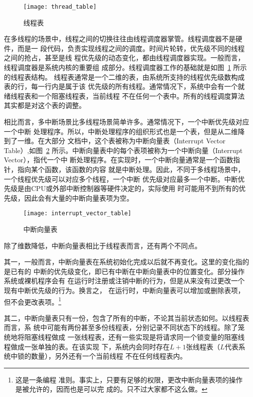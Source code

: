 \begin{figure}[H]
	\centering
	\texttt{[image: thread\_table]}
	\caption{线程表}
	\label{fig:thread_table}
\end{figure}

在多线程的场景中，线程之间的切换往往由线程调度器掌管。线程调度器不是硬件，而是一
段代码，负责实现线程之间的调度。时间片轮转，优先级不同的线程之间的抢占，甚至是线
程优先级的动态变化，都由线程调度器实现。一般而言，线程调度器是系统内核的重要组
成部分。线程调度器工作的基础就是如图~\ref{fig:thread_table} 所示的线程表结构。
线程表通常是一个二维的表，由系统所支持的线程优先级数构成表的行，每一行内是属于该
优先级的所有线程。通常情况下，系统中会有一个就绪线程表和一个阻塞线程表，当前线程
不在任何一个表中。所有的线程调度算法其实都是对这个表的调整。

相比而言，多中断场景比多线程场景简单许多。通常情况下，一个中断优先级对应一个中断
处理程序。所以，中断处理程序的组织形式也是一个表，但是从二维降到了一维。在大部分
文档中，这个表被称为中断向量表（Interrupt Vector Table）,如图~\ref{fig:interrupt_vector_table} 
所示。中断向量表中的每个表项被称为一个中断向量（Interrupt Vector），指代一个中
断处理程序。在实现时，一个中断向量通常是一个函数指针，指向某个函数，该函数的内容
就是中断处理。因此，不同于多线程场景中，一个线程优先级可以对应多个线程，一个中断
优先级对应最多一个中断。中断优先级是由CPU或外部中断控制器等硬件决定的，实际使用
时可能用不到所有的优先级，因此会有大量的中断向量表项为空。

\begin{figure}[H]
	\centering
	\texttt{[image: interrupt\_vector\_table]}
	\caption{中断向量表}
	\label{fig:interrupt_vector_table}
\end{figure}

除了维数降低，中断向量表相比于线程表而言，还有两个不同点。

其一，一般而言，中断向量表在系统初始化完成以后就不再变化。这里的变化指的是已有的
中断的优先级变化，即已有中断在中断向量表中的位置变化。部分操作系统或裸机程序会有
在运行时注册或注销中断的行为，但是从来没有过更改一个现有中断优先级的行为。换言之，
在运行时，中断向量表可以增加或删除表项，但不会更改表项。\footnote{这是一条编程
准则。事实上，只要有足够的权限，更改中断向量表项的操作是被允许的，因而也是可以完
成的。只不过大家都不这么做。}

其二，中断向量表只有一份，包含了所有的中断，不论其当前状态如何。以线程表而言，系
统中可能有两份甚至多份线程表，分别记录不同状态下的线程。除了笼统地将阻塞线程做成
一张线程表，还有一些实现是将请求同一个锁变量的阻塞线程做成一张单独的表。在该实现
下，系统内会同时存在$L+1$张线程表（$L$代表系统中锁的数量），另外还有一个当前线程
不在任何线程表内。

